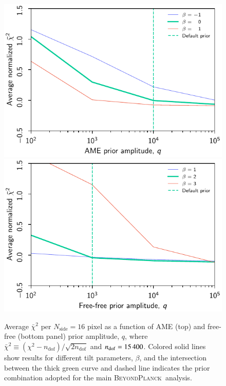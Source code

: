 \documentclass{aa}
\def\,{\thinspace}
\newcommand{\BP}{\textsc{BeyondPlanck}}
\begin{document}
\begin{figure}
  \center       
  \includegraphics[width=\linewidth]{figs/chisq_ame_prior_v1.pdf}
  \includegraphics[width=\linewidth]{figs/chisq_ff_prior_v1.pdf}\\
  \caption{Average $\bar{\chi}^2$ per $N_{\mathrm{side}}=16$ pixel as a function of AME (top) and free-free (bottom panel) prior amplitude, $q$, where $\bar{\chi}^2\equiv (\chi^2-n_{\mathrm{dof}})/\sqrt{2n_\mathrm{dof}}$ and $n_{\mathrm{dof}}=15\,400$. Colored solid lines show results for different tilt parameters, $\beta$, and the intersection between the thick green curve and dashed line indicates the prior combination adopted for the main \BP\ analysis.}
  \label{fig:chisq_prior}
\end{figure}
\end{document}

